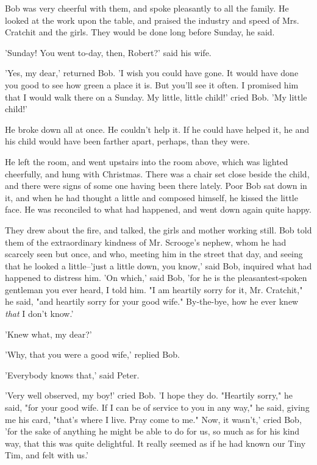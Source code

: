 Bob was very cheerful with them, and spoke pleasantly to all the family.
He looked at the work upon the table, and praised the industry and speed
of Mrs. Cratchit and the girls. They would be done long before Sunday,
he said.

'Sunday! You went to-day, then, Robert?' said his wife.

'Yes, my dear,' returned Bob. 'I wish you could have gone. It would have
done you good to see how green a place it is. But you'll see it often. I
promised him that I would walk there on a Sunday. My little, little
child!' cried Bob. 'My little child!'

He broke down all at once. He couldn't help it. If he could have helped
it, he and his child would have been farther apart, perhaps, than they
were.

He left the room, and went upstairs into the room above, which was
lighted cheerfully, and hung with Christmas. There was a chair set close
beside the child, and there were signs of some one having been there
lately. Poor Bob sat down in it, and when he had thought a little and
composed himself, he kissed the little face. He was reconciled to what
had happened, and went down again quite happy.

They drew about the fire, and talked, the girls and mother working
still. Bob told them of the extraordinary kindness of Mr. Scrooge's
nephew, whom he had scarcely seen but once, and who, meeting him in the
street that day, and seeing that he looked a little--'just a little
down, you know,' said Bob, inquired what had happened to distress him.
'On which,' said Bob, 'for he is the pleasantest-spoken gentleman you
ever heard, I told him. "I am heartily sorry for it, Mr. Cratchit," he
said, "and heartily sorry for your good wife." By-the-bye, how he ever
knew \emph{that} I don't know.'

'Knew what, my dear?'

'Why, that you were a good wife,' replied Bob.

'Everybody knows that,' said Peter.

'Very well observed, my boy!' cried Bob. 'I hope they do. "Heartily
sorry," he said, "for your good wife. If I can be of service to you in
any way," he said, giving me his card, "that's where I live. Pray come
to me." Now, it wasn't,' cried Bob, 'for the sake of anything he might
be able to do for us, so much as for his kind way, that this was quite
delightful. It really seemed as if he had known our Tiny Tim, and felt
with us.'

